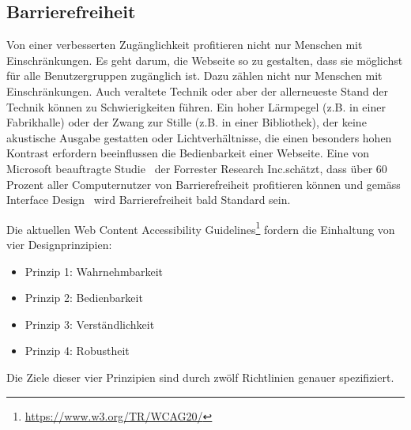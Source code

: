 
\subsection{Barrierefreiheit}

Von einer verbesserten Zugänglichkeit profitieren nicht nur Menschen mit Einschränkungen. Es geht darum, die Webseite so zu gestalten, dass sie möglichst für alle Benutzergruppen zugänglich ist. Dazu zählen nicht nur Menschen mit Einschränkungen. Auch veraltete Technik oder aber der allerneueste Stand der Technik können zu Schwierigkeiten führen. Ein hoher Lärmpegel (z.B. in einer Fabrikhalle) oder der Zwang zur Stille (z.B. in einer Bibliothek), der keine akustische Ausgabe gestatten oder Lichtverhältnisse, die einen besonders hohen Kontrast erfordern beeinflussen die Bedienbarkeit einer Webseite. Eine von Microsoft beauftragte Studie~\cite{ForresterResearch2004E:Abilities} der \flqq Forrester Research Inc.\frqq schätzt, dass über 60 Prozent aller Computernutzer von Barrierefreiheit profitieren können und gemäss \flqq Interface Design\frqq ~\cite{ThesmannStephan2016ID:U} wird Barrierefreiheit bald Standard sein.

Die aktuellen Web Content Accessibility Guidelines\footnote{ \url{https://www.w3.org/TR/WCAG20/}} fordern die Einhaltung von vier Designprinzipien:

\begin{itemize}  
\item Prinzip 1: Wahrnehmbarkeit 
\item Prinzip 2: Bedienbarkeit
\item Prinzip 3: Verständlichkeit
\item Prinzip 4: Robustheit
\end{itemize}

Die Ziele dieser vier Prinzipien sind durch zwölf Richtlinien genauer spezifiziert. 



